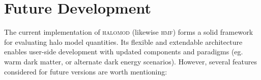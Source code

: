 \documentclass[5p,aas_macros]{elsarticle}
\newcommand{\halomod}{\textsc{halomod}\xspace} %
\providecommand{\DIFdelend}{} %
\begin{document}




\DIFdelend \section{Future Development}
\label{sec:future}
The current implementation of \textsc{halomod} (likewise \textsc{hmf}) forms a solid framework for evaluating halo model quantities. Its flexible and extendable architecture enables user-side development with updated components and paradigms (eg. warm dark matter, or alternate dark energy scenarios). However, several features considered for future versions are worth mentioning:
\end{document}
